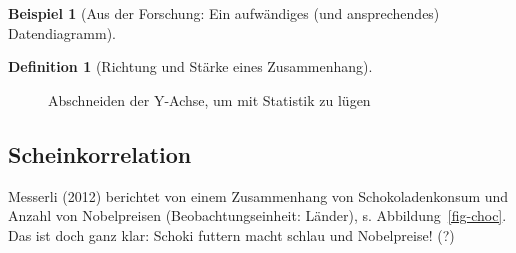 \documentclass[
  a4paper,
]{scrbook}
\theoremstyle{definition}
\newtheorem{example}{Beispiel}[chapter]
\theoremstyle{definition}
\newtheorem{definition}{Definition}[chapter]
\theoremstyle{definition}
\theoremstyle{remark}
\begin{document}
\begin{example}[Aus der Forschung: Ein aufwändiges (und ansprechendes)
Datendiagramm]
\begin{definition}[Richtung und Stärke eines
Zusammenhang]
\begin{figure}
\begin{minipage}{0.50\linewidth}
{}


\end{minipage}%
%
\begin{minipage}{0.50\linewidth}



\end{minipage}%

\caption{\label{fig-lie2}Abschneiden der Y-Achse, um mit Statistik zu
lügen}

\end{figure}%

\subsection{Scheinkorrelation}\label{scheinkorrelation}

Messerli (2012) berichtet von einem Zusammenhang von Schokoladenkonsum
und Anzahl von Nobelpreisen (Beobachtungseinheit: Länder), s.
Abbildung~\ref{fig-choc}. Das ist doch ganz klar: Schoki futtern macht
schlau und Nobelpreise! (?)

\begin{figure}

\centering{

}
\end{figure}
\end{definition}
\end{example}
\end{document}
